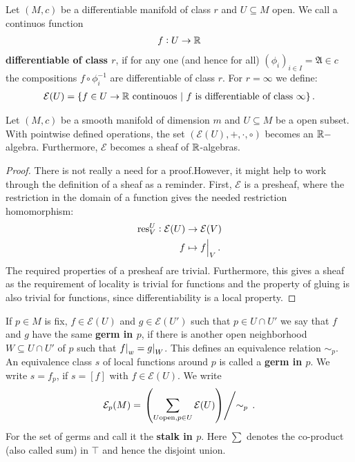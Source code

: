 \begin{definition}
    Let $(M,c)$ be a differentiable manifold of class $r$ and $U\subseteq M$ open. We call a continuos function 
    \begin{align*}
        f:U \to \mathbb{R}
    \end{align*} \textbf{differentiable of class $r$}, if for any one (and hence for all) $(\phi_i)_{i\in I}=\mathfrak{A}\in c$ the compositions $f\circ \phi_i^{-1}$ are differentiable of class $r$. For $r=\infty$ we define:
    \begin{align*}
        \mathcal{E}(U)=\{f\in U \to \mathbb{R} \text{ continouos}~|~ f \text{ is differentiable of class }\infty \} \, . 
    \end{align*}
\end{definition}
\begin{corollary}
    Let $(M,c)$ be a smooth manifold of dimension $m$ and $U\subseteq M$ be a open subset. With pointwise defined operations, the set $(\mathcal{E}(U),+,\cdot,\circ)$ becomes an $\mathbb{R}-$algebra. Furthermore, $\mathcal{E}$ becomes a sheaf of $\mathbb{R}$-algebras.
\end{corollary}
\begin{proof}
    There is not really a need for a proof.However, it might help to work through the definition of a sheaf as a reminder. First, $\mathcal{E}$ is a presheaf, where the restriction in the domain of a function gives the needed restriction homomorphism:
    \begin{align*}
        \text{res}^U_V: \mathcal{E}(U) &\to \mathcal{E}(V) \\
                                     f &\mapsto \restr{f}{V} \, .
    \end{align*} The required properties of a presheaf are trivial. Furthermore, this gives a sheaf as the requirement of locality is trivial for functions and the property of gluing is also trivial for functions, since differentiability is a local property.
\end{proof}
\begin{definition}
    If $p\in M$ is fix, $f\in \mathcal{E}(U)$ and $g\in \mathcal{E}(U')$ such that $p\in U\cap U'$ we say that $f$ and $g$ have the same \textbf{germ in $p$}, if there is another open neighborhood $W\subseteq U\cap U'$ of $p$ such that $\restr{f}{w}=\restr{g}{W}$. This defines an equivalence relation $\sim_p$. An equivalence class $s$ of local functions around $p$ is called a \textbf{germ in $p$}. We write $s=f_p$, if $s=[f]$ with $f\in \mathcal{E}(U)$. 
    We write 
    \begin{align*}
        \mathcal{E}_p(M)=\left. \left( \sum_{U \text{open},p\in U }\mathcal{E}(U)\right)\middle/ \sim_p \right. \, .
    \end{align*} For the set of germs and call it the \textbf{stalk in $p$}. Here $\sum$ denotes the co-product (also called sum)  in $\top$ and hence the disjoint union.
\end{definition}
